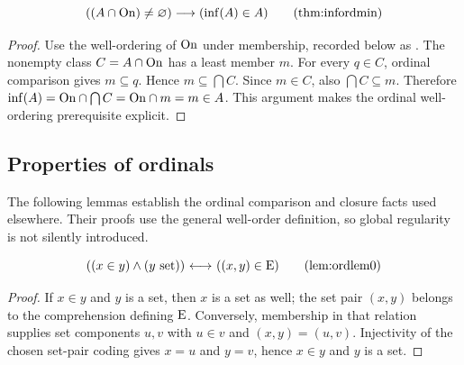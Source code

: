 \begin{theorem}
\[
((A\cap\On)\neq\emptyclass)\implies(\inf(A)\in A)
\labeltagd{thm}{infordmin}
\]
\begin{proof}
Use the well-ordering of $\mathrm{On}$ under membership, recorded below as
. The nonempty class $C=A\cap\mathrm{On}$ has a least member
$m$. For every $q\in C$, ordinal comparison gives $m\subseteq q$.
Hence $m\subseteq\bigcap C$. Since $m\in C$, also
$\bigcap C\subseteq m$. Therefore
$\inf(A)=\mathrm{On}\cap\bigcap C=\mathrm{On}\cap m=m\in A$.
This argument makes the ordinal well-ordering prerequisite explicit.
\end{proof}
\end{theorem}

\subsection{Properties of ordinals}
The following lemmas establish the ordinal comparison and closure facts
used elsewhere. Their proofs use the general well-order definition, so
global regularity is not silently introduced.

\begin{lemma}
\[
((x\in y)\land(y\set)) \iff ((x,y)\in\E)
\labeltagd{lem}{ordlem0}
\]
\end{lemma}
\begin{proof}
If $x\in y$ and $y$ is a set, then $x$ is a set as well; the set pair
$(x,y)$ belongs to the comprehension defining $\mathrm{E}$. Conversely, membership
in that relation supplies set components $u,v$ with $u\in v$ and
$(x,y)=(u,v)$. Injectivity of the chosen set-pair coding gives $x=u$ and
$y=v$, hence $x\in y$ and $y$ is a set.
\end{proof}

